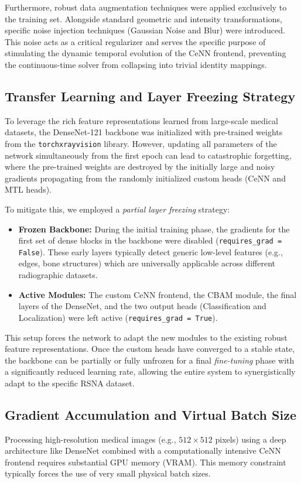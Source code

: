 \documentclass[a4paper,fleqn]{cas-dc}
\begin{document}
Furthermore, robust data augmentation techniques were applied exclusively to the training set. Alongside standard geometric and intensity transformations, specific noise injection techniques (Gaussian Noise and Blur) were introduced. This noise acts as a critical regularizer and serves the specific purpose of stimulating the dynamic temporal evolution of the CeNN frontend, preventing the continuous-time solver from collapsing into trivial identity mappings.

\subsection{Transfer Learning and Layer Freezing Strategy}
\label{sec:transf_learn}
To leverage the rich feature representations learned from large-scale medical datasets, the DenseNet-121 backbone was initialized with pre-trained weights from the \texttt{torchxrayvision} library. However, updating all parameters of the network simultaneously from the first epoch can lead to catastrophic forgetting, where the pre-trained weights are destroyed by the initially large and noisy gradients propagating from the randomly initialized custom heads (CeNN and MTL heads).

To mitigate this, we employed a \textit{partial layer freezing} strategy:
\begin{itemize}
	\item \textbf{Frozen Backbone:} During the initial training phase, the gradients for the first set of dense blocks in the backbone were disabled (\texttt{requires\_grad = False}). These early layers typically detect generic low-level features (e.g., edges, bone structures) which are universally applicable across different radiographic datasets.
	\item \textbf{Active Modules:} The custom CeNN frontend, the CBAM module, the final layers of the DenseNet, and the two output heads (Classification and Localization) were left active (\texttt{requires\_grad = True}).
\end{itemize}
This setup forces the network to adapt the new modules to the existing robust feature representations. Once the custom heads have converged to a stable state, the backbone can be partially or fully unfrozen for a final \textit{fine-tuning} phase with a significantly reduced learning rate, allowing the entire system to synergistically adapt to the specific RSNA dataset.

\subsection{Gradient Accumulation and Virtual Batch Size}
Processing high-resolution medical images (e.g., $512 \times 512$ pixels) using a deep architecture like DenseNet combined with a computationally intensive CeNN frontend requires substantial GPU memory (VRAM). This memory constraint typically forces the use of very small physical batch sizes.
\end{document}
